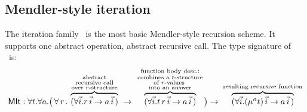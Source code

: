 \subsection{Mendler-style iteration}\label{sec:mendler:it}
The iteration family \MIt\ is the most basic Mendler-style recursion scheme.
It supports one abstract operation, abstract recursive call.
The type signature of \MIt\ is:
\[ \textsf{MIt} : \forall t . \forall a .
   \big(\, \forall\, r\, . \;
         \overset{\begin{smallmatrix}
                        \text{abstract} \\
                        \text{recursive call} \\
                        \text{over $r$-structure}
                       \end{smallmatrix}}{\overbrace{
            (\forall\vec{i} . r\,\vec{i} -> a\,\vec{i}\,) }} \;
   -> \; \overset{\begin{smallmatrix}
                        \text{function body desc.:} \\
                        \text{combines a $t$-structure} \\
                        \text{of $r$-values } \\
                        \text{into an answer}
                       \end{smallmatrix}}{\overbrace{
            (\forall\vec{i} . t\, r\,\vec{i} -> a\,\vec{i}\,) }}
   \big)
 -> \; \overset{\text{resulting recursive function}}{\overbrace{
          (\forall\vec{i} . (\mu^\kappa t)\,\vec{i} -> a\,\vec{i}\,) }} 
\]
